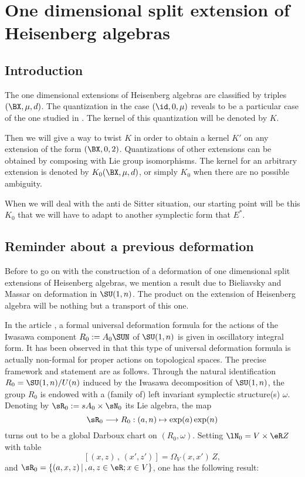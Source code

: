 %
   \section{One dimensional split extension of Heisenberg algebras} \label{SecExtHeiz}
%

\subsection{Introduction}

The one dimensional extensions of Heisenberg algebras are classified by triples $(\BX,\mu,d)$. The quantization in the case $(\id,0,\mu)$  reveals to be a particular case of the one studied in \cite{Biel-Massar}. The kernel of this quantization will be denoted by $K$. 

Then we will give a way to twist $K$ in order to obtain a kernel $K'$ on any extension of the form $(\BX,0,2)$. Quantizations of other extensions can be obtained by composing with Lie group isomorphisms. The kernel for an arbitrary extension is denoted by $K_{0}(\BX,\mu,d)$, or simply $K_{0}$ when there are no possible ambiguity.

When we will deal with the anti de Sitter situation, our starting point will be this $K_{0}$ that we will have to adapt to another symplectic form that $E^*$. 

\subsection{Reminder about a previous deformation} 

Before to go on with the construction of a deformation of one dimensional split extensions of Heisenberg algebras, we mention a result due to Bieliavsky and Massar on deformation in $\SU(1,n)$. The product on the extension of Heisenberg algebra will be nothing but a transport of this one.

In the article \cite{Biel-Massar}, a formal universal deformation formula for the actions of the Iwasawa component $ R_0:= A_0\SUN$ of $\SU(1,n)$ is given in oscillatory integral form.  It has been observed in \cite{lcBBM} that this type of universal deformation formula is actually non-formal for proper actions on topological spaces. The precise framework  and statement are as follows.  Through the natural identification $ R_0=\SU(1,n)/U(n)$ induced by the Iwasawa decomposition of $\SU(1,n)$, the group $ R_0$ is endowed with a (family of) left invariant symplectic structure(s) $\omega$.  Denoting by $\sR_0:=sA_0\times\sN_0$ its Lie algebra, the map
\begin{equation} \label{DARBOUX}
	\sR_0\longrightarrow  R_0:(a,n)\mapsto\exp(a)\exp(n)
\end{equation}
turns out to be a global Darboux chart on $( R_0,\omega)$.  Setting $\lN_0=V\times\eR Z$ with table 
\[ 
[(x,z)\,,\,(x',z')]=\Omega_V(x,x')\,Z, 
\]
and  $\sR_0=\{(a,x,z)\,|\,,a,z\in\eR;x\in V\}$, one has the following result:

